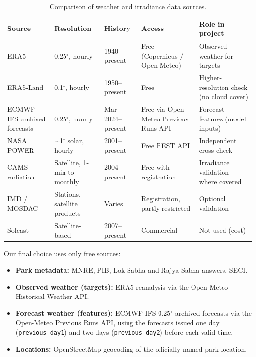 \documentclass[12pt]{report}
\begin{document}
\begin{table}[htbp]
\centering
\caption{Comparison of weather and irradiance data sources.}
\label{tab:weather}
\footnotesize
\begin{tabularx}{\textwidth}{p{2.5cm}p{3.0cm}p{2.3cm}LL}
\toprule
Source & Resolution & History & Access & Role in project \\
\midrule
ERA5 \cite{era5} & 0.25$^\circ$, hourly & 1940--present & Free (Copernicus / Open-Meteo) & Observed weather for targets \\
ERA5-Land \cite{era5land} & 0.1$^\circ$, hourly & 1950--present & Free & Higher-resolution check (no cloud cover) \\
ECMWF IFS archived forecasts & 0.25$^\circ$, hourly & Mar 2024--present & Free via Open-Meteo Previous Runs API \cite{openmeteo} & Forecast features (model inputs) \\
NASA POWER \cite{nasapower} & $\sim$1$^\circ$ solar, hourly & 2001--present & Free REST API & Independent cross-check \\
CAMS radiation \cite{cams} & Satellite, 1-min to monthly & 2004--present & Free with registration & Irradiance validation where covered \\
IMD / MOSDAC & Stations, satellite products & Varies & Registration, partly restricted & Optional validation \\
Solcast & Satellite-based & 2007--present & Commercial & Not used (cost) \\
\bottomrule
\end{tabularx}
\end{table}

Our final choice uses only free sources:
\begin{itemize}[noitemsep]
    \item \textbf{Park metadata:} MNRE, PIB, Lok Sabha and Rajya Sabha answers, SECI.
    \item \textbf{Observed weather (targets):} ERA5 reanalysis via the Open-Meteo Historical Weather API.
    \item \textbf{Forecast weather (features):} ECMWF IFS 0.25$^\circ$ archived forecasts via the Open-Meteo Previous Runs API, using the forecasts issued one day (\texttt{previous\_day1}) and two days (\texttt{previous\_day2}) before each valid time.
    \item \textbf{Locations:} OpenStreetMap geocoding of the officially named park location.
\end{itemize}
\end{document}
